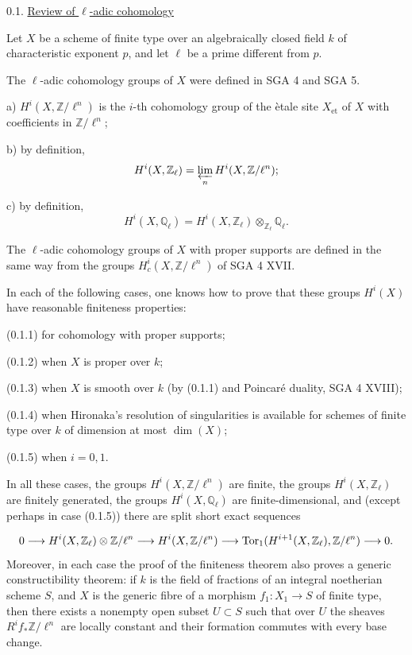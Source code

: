 
0.1. \underline{Review of $\ell$-adic cohomology}

Let $X$ be a scheme of finite type over an algebraically closed field $k$ of characteristic exponent $p$, and let $\ell$ be a prime different from $p$.

The $\ell$-adic cohomology groups of $X$ were defined in SGA 4 and SGA 5.

a) $H^i(X,\mathbb{Z}/\ell^n)$ is the $i$-th cohomology group of the \`etale site $X_{\mathrm{et}}$ of $X$ with coefficients in $\mathbb{Z}/\ell^n$;

b) by definition,
\[
H^i(X,\mathbb{Z}_\ell)=\varprojlim_n H^i(X,\mathbb{Z}/\ell^n);
\]

c) by definition,
\[
H^i(X,\mathbb{Q}_\ell)=H^i(X,\mathbb{Z}_\ell)\otimes_{\mathbb{Z}_\ell}\mathbb{Q}_\ell.
\]

The $\ell$-adic cohomology groups of $X$ with proper supports are defined in the same way from the groups $H^i_c(X,\mathbb{Z}/\ell^n)$ of SGA 4 XVII.

In each of the following cases, one knows how to prove that these groups $H^i(X)$ have reasonable finiteness properties:

(0.1.1) for cohomology with proper supports;

(0.1.2) when $X$ is proper over $k$;

(0.1.3) when $X$ is smooth over $k$ (by (0.1.1) and Poincar\'e duality, SGA 4 XVIII);

(0.1.4) when Hironaka's resolution of singularities is available for schemes of finite type over $k$ of dimension at most $\dim(X)$;

(0.1.5) when $i=0,1$.


In all these cases, the groups $H^i(X,\mathbb{Z}/\ell^n)$ are finite, the groups $H^i(X,\mathbb{Z}_\ell)$ are finitely generated, the groups $H^i(X,\mathbb{Q}_\ell)$ are finite-dimensional, and (except perhaps in case (0.1.5)) there are split short exact sequences

\begin{equation*}
0 \longrightarrow H^i(X,\mathbb{Z}_\ell)\otimes \mathbb{Z}/\ell^n
\longrightarrow H^i(X,\mathbb{Z}/\ell^n)
\longrightarrow \operatorname{Tor}_1(H^{i+1}(X,\mathbb{Z}_\ell),\mathbb{Z}/\ell^n)
\longrightarrow 0.
\end{equation*}
Moreover, in each case the proof of the finiteness theorem also proves a generic constructibility theorem: if $k$ is the field of fractions of an integral noetherian scheme $S$, and $X$ is the generic fibre of a morphism $f_1:X_1\longrightarrow S$ of finite type, then there exists a nonempty open subset $U\subset S$ such that over $U$ the sheaves $R^i f_*\mathbb{Z}/\ell^n$ are locally constant and their formation commutes with every base change.

